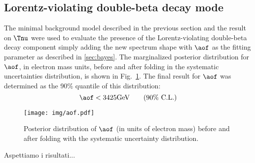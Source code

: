 \subsection*{Lorentz-violating double-beta decay mode}
The minimal background model described in the previous section and the result on $\Tnu$ were used to evaluate the presence of the Lorentz-violating double-beta decay component simply adding the new spectrum shape with $\aof$ as the fitting parameter as described in \ref{sec:bayes}. The marginalized posterior distribution for $\aof$, in electron mass units, before and after folding in the systematic uncertainties distribution, is shown in Fig.~\ref{fig:aofpost}. The final result for $\aof$ was determined as the 90\% quantile of this distribution:
\begin{equation}\aof<3425 \text{GeV}\qquad(\text{90\% C.L.})\end{equation}
\begin{figure}
	\centering
	\texttt{[image: img/aof.pdf]}
	\caption{Posterior distribution of $\aof$ (in units of electron mass) before and after folding with the systematic uncertainty distribution.}\label{fig:aofpost}
\end{figure}

 {\color{red}Aspettiamo i risultati...}

